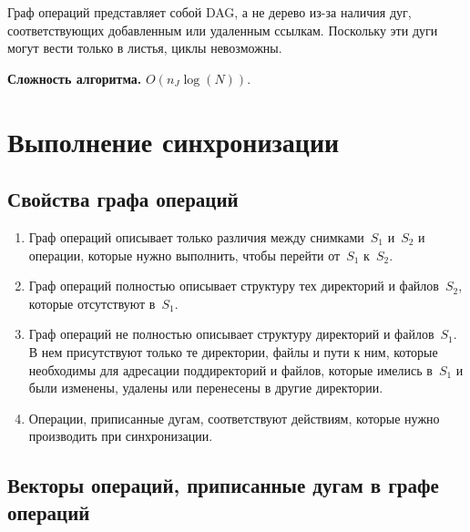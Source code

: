 \begin{multicols}{2}
      Граф операций представляет собой DAG, а не дерево из-за наличия дуг, 
соответствующих до\-бав\-лен\-ным или удаленным ссылкам. Поскольку эти дуги 
могут вести только в листья, циклы не\-воз\-можны.

      \smallskip
      
      \noindent
      \textbf{Сложность алгоритма.} $O(n_J \log (N))$.

\section{Выполнение синхронизации}

\subsection{Свойства графа операций}

\noindent
\begin{enumerate}[1.]
\item Граф операций описывает только различия между снимками~$S_1$ 
и~$S_2$ и операции, которые нужно выполнить, чтобы перейти от~$S_1$ 
к~$S_2$.\\[-15pt]
\item Граф операций полностью описывает структуру тех директорий и 
файлов~$S_2$, которые отсутствуют в~$S_1$.\\[-15pt]
\item Граф операций не полностью описывает структуру директорий и 
файлов~$S_1$. В нем присутствуют только те директории, файлы и пути к 
ним, которые необходимы для адресации поддиректорий и файлов, которые 
имелись в~$S_1$ и были изменены, удалены или перенесены в другие 
директории.\\[-15pt]
\item Операции, приписанные дугам, соответствуют действиям, которые 
нужно производить при синхронизации. 
\end{enumerate}

\vspace*{-3pt}
\subsection{Векторы операций, приписанные дугам в графе операций}
      

\end{multicols}
